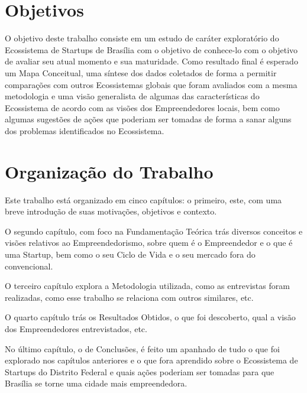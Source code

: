 \section{Objetivos}
\label{section:objetivos}

O objetivo deste trabalho consiste em um estudo de caráter exploratório do Ecossistema de Startups de Brasília com o objetivo de conhece-lo com o objetivo de avaliar seu atual momento e sua maturidade. Como resultado final é esperado um Mapa Conceitual, uma síntese dos dados coletados de forma a permitir comparações com outros Ecossistemas globais que foram avaliados com a mesma metodologia e uma visão generalista de algumas das características do Ecossistema de acordo com as visões dos Empreendedores locais, bem como algumas sugestões de ações que poderiam ser tomadas de forma a sanar alguns dos problemas identificados no Ecossistema.

\section{Organização do Trabalho}
\label{section:organizacao_do_trabalho}

Este trabalho está organizado em cinco capítulos: o primeiro, este, com uma breve introdução de suas motivações, objetivos e contexto. 

O segundo capítulo, com foco na Fundamentação Teórica trás diversos conceitos e visões relativos ao Empreendedorismo, sobre quem é o Empreendedor e o que é uma Startup, bem como o seu Ciclo de Vida e o seu mercado fora do convencional. 

O terceiro capítulo explora a Metodologia utilizada, como as entrevistas foram realizadas, como esse trabalho se relaciona com outros similares, etc. 

O quarto capítulo trás os Resultados Obtidos, o que foi descoberto, qual a visão dos Empreendedores entrevistados, etc.

No último capítulo, o de Conclusões, é feito um apanhado de tudo o que foi explorado nos capítulos anteriores e o que fora aprendido sobre o Ecossistema de Startups do Distrito Federal e quais ações poderiam ser tomadas para que Brasília se torne uma cidade mais empreendedora.